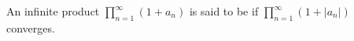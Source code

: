 \documentclass[12pt]{article}
\begin{document}
An infinite product $\prod_{n=1}^{\infty}(1+a_n)$ is said to be \emph{} if $\prod_{n=1}^{\infty}(1+|a_n|)$ converges.
\end{document}
